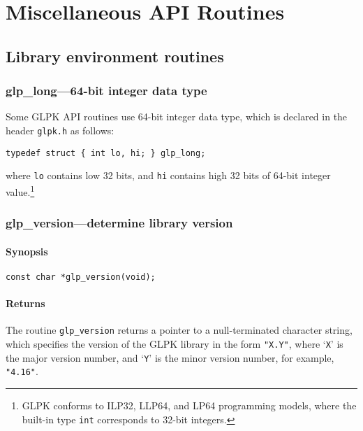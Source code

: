 
\chapter{Miscellaneous API Routines}

\section{Library environment routines}

\subsection{glp\_long---64-bit integer data type}

Some GLPK API routines use 64-bit integer data type, which is declared
in the header \verb|glpk.h| as follows:

\begin{verbatim}
typedef struct { int lo, hi; } glp_long;
\end{verbatim}

\noindent
where \verb|lo| contains low 32 bits, and \verb|hi| contains high 32
bits of 64-bit integer value.\footnote{GLPK conforms to ILP32, LLP64,
and LP64 programming models, where the built-in type {\tt int}
corresponds to 32-bit integers.}

\subsection{glp\_version---determine library version}

\subsubsection*{Synopsis}

\begin{verbatim}
const char *glp_version(void);
\end{verbatim}

\subsubsection*{Returns}

The routine \verb|glp_version| returns a pointer to a null-terminated
character string, which specifies the version of the GLPK library in
the form \verb|"X.Y"|, where `\verb|X|' is the major version number, and
`\verb|Y|' is the minor version number, for example, \verb|"4.16"|.

